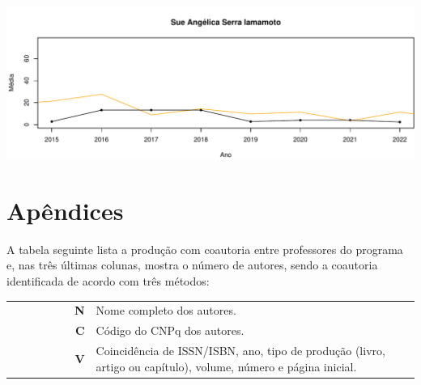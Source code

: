 \documentclass[12pt,brazil]{article}\usepackage[]{graphicx}\usepackage[]{xcolor}
\makeatletter
\def\maxwidth{ %
  \ifdim\Gin@nat@width>\linewidth
    \linewidth
  \else
    \Gin@nat@width
  \fi
}
\newcounter{tabela}
\makeatother
\begin{document}
\vspace{0.5cm}


{\centering \includegraphics[width=\maxwidth]{figure/mediamovel-22} 

}



\vspace{0.5cm}


\clearpage

\section{Apêndices}

A tabela seguinte lista a produção com coautoria entre professores do
programa e, nas três últimas colunas, mostra o número de autores, sendo a
coautoria identificada de acordo com três métodos:

\vspace{2mm}

\begin{tabular}{crl}
 ~~~~~~~~~ &  \textbf{N} & Nome completo dos autores.\\
 ~~~~~~~~~ &  \textbf{C} & Código do CNPq dos autores.\\
 ~~~~~~~~~ &  \textbf{V} & Coincidência de ISSN/ISBN, ano, tipo de produção (livro, artigo ou capítulo), volume, número e página inicial. \\
\end{tabular}
\end{document}
